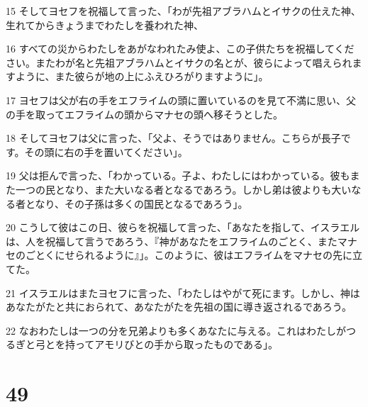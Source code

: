 \par 15 そしてヨセフを祝福して言った、「わが先祖アブラハムとイサクの仕えた神、生れてからきょうまでわたしを養われた神、
\par 16 すべての災からわたしをあがなわれたみ使よ、この子供たちを祝福してください。またわが名と先祖アブラハムとイサクの名とが、彼らによって唱えられますように、また彼らが地の上にふえひろがりますように」。
\par 17 ヨセフは父が右の手をエフライムの頭に置いているのを見て不満に思い、父の手を取ってエフライムの頭からマナセの頭へ移そうとした。
\par 18 そしてヨセフは父に言った、「父よ、そうではありません。こちらが長子です。その頭に右の手を置いてください」。
\par 19 父は拒んで言った、「わかっている。子よ、わたしにはわかっている。彼もまた一つの民となり、また大いなる者となるであろう。しかし弟は彼よりも大いなる者となり、その子孫は多くの国民となるであろう」。
\par 20 こうして彼はこの日、彼らを祝福して言った、「あなたを指して、イスラエルは、人を祝福して言うであろう、『神があなたをエフライムのごとく、またマナセのごとくにせられるように』」。このように、彼はエフライムをマナセの先に立てた。
\par 21 イスラエルはまたヨセフに言った、「わたしはやがて死にます。しかし、神はあなたがたと共におられて、あなたがたを先祖の国に導き返されるであろう。
\par 22 なおわたしは一つの分を兄弟よりも多くあなたに与える。これはわたしがつるぎと弓とを持ってアモリびとの手から取ったものである」。

\chapter{49}

